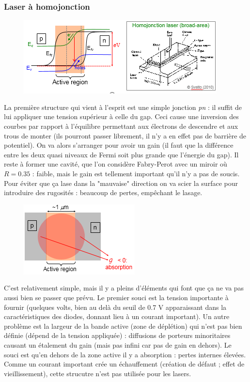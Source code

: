 		\subsubsection{Laser à homojonction}
 		\begin{figure}
		\vspace{-5mm}
		\includegraphics[scale=0.6]{ch5/image36}
		\end{figure} 	
 		La première structure qui vient à l'esprit est une simple jonction \textit{pn} : il suffit
 		de lui appliquer une tension supérieur à celle du gap. Ceci cause une inversion des courbes
 		par rapport à l'équilibre permettant aux électrons de descendre et aux trous de monter (ils
 		pourront passer librement, il n'y a en effet pas de barrière de potentiel). On va alors 
 		s'arranger pour avoir un gain (il faut que la différence entre les deux quasi niveaux de Fermi
 		soit plus grande que l'énergie du gap). Il reste à former une cavité, que l'on considère 
 		Fabry-Perot avec un miroir où $R=0.35$ : faible, mais le gain est tellement important qu'il 
 		n'y a pas de soucis. Pour éviter que ça lase dans la "mauvaise" direction on va scier la 
 		surface pour introduire des rugosités : beaucoup de pertes, empêchant le lasage.\\
 		
 		\begin{figure}
		\vspace{-5mm}
		\includegraphics[scale=0.8]{ch5/image37}
		\end{figure}
 		C'est relativement simple, mais il y a pleins d'éléments qui font que ça ne va pas aussi 
 		bien se passer que prévu. Le premier souci est la tension importante à fournir (quelques 
 		volts, bien au delà du seuil de 0.7 V apparaissant dans la caractéristiques des diodes, 
 		donnant lieu à un courant important). Un autre problème est la largeur de la bande active
 		(zone de déplétion) qui n'est pas bien définie (dépend de la tension appliquée) : diffusions
 		de porteurs minoritaires causant un étalement du gain (mais pas infini car pas de gain en 
 		dehors). Le souci est qu'en dehors de la zone active il y a absorption : pertes internes 
 		élevées. Comme un courant important crée un échauffement (création de défaut ; effet de 
 		vieillissement), cette strucutre n'est pas utilisée pour les lasers.
 		

